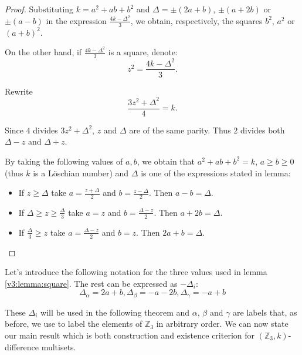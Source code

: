 \begin{proof}
	Substituting $k=a^2+ab+b^2$ and $\Delta=\pm (2a+b)$, $\pm (a+2b)$ or $\pm (a-b)$ in the expression $\frac{4k-\Delta^2}{3}$, we obtain, respectively, the squares $b^2$, $a^2$ or $(a+b)^2$.
	
	On the other hand, if $\frac{4k-\Delta^2}{3}$ is a square, denote:
	\begin{equation}
		z^2 = \frac{4k-\Delta^2}{3}.
	\end{equation}
	
	Rewrite
	\begin{equation}
		\frac{3z^2 + \Delta^2}{4} = k.
	\end{equation}
	
	Since $4$ divides $3z^2 + \Delta^2$, $z$ and $\Delta$ are of the same parity. Thus $2$ divides both $\Delta-z$ and $\Delta+z$.
	
	By taking the following values of $a,b$, we obtain that $a^2+ab+b^2=k$, $a \geq b \geq 0$ (thus $k$ is a Löschian number) and $\Delta$ is one of the expressions stated in lemma:
	
	\begin{itemize}
		\item If $z \geq \Delta$ take $a=\frac{z+\Delta}{2}$ and $b=\frac{z-\Delta}{2}$. Then $a-b=\Delta$.
		\item If $\Delta \geq z \geq \frac \Delta 3$ take $a=z$ and $b=\frac{\Delta-z}{2}$. Then $a+2b=\Delta$.
		\item If $\frac \Delta 3 \geq z$ take $a=\frac{\Delta-z}{2}$ and $b=z$. Then $2a+b=\Delta$.
	\end{itemize}
\end{proof}

Let's introduce the following notation for the three values used in lemma \ref{v3:lemma:square}. The rest can be expressed as $-\Delta_i$:
\begin{equation}
	\label{v3:eq:deltas}
	\Delta_\alpha = 2a+b, \Delta_\beta = -a-2b, \Delta_\gamma = -a+b
\end{equation}

These $\Delta_i$ will be used in the following theorem and $\alpha$, $\beta$ and $\gamma$ are labels that, as before, we use to label the elements of $\mathbb Z_3$ in arbitrary order. We can now state our main result which is both construction and existence criterion for $(\mathbb Z_3,k)$-difference multisets.

